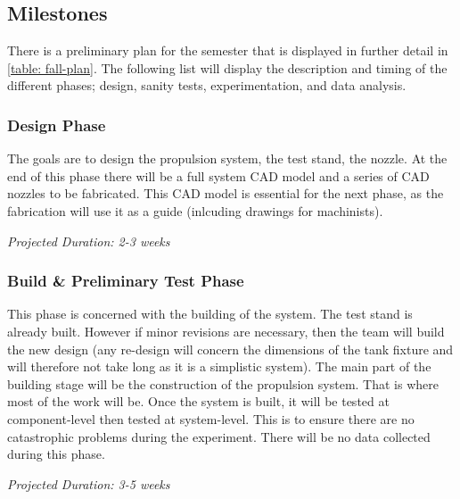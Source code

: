 \documentclass[conference]{IEEEtran} %
\begin{document}
\subsection{Milestones}
\label{subsec:milestones}

There is a preliminary plan for the semester that is displayed in further detail in \autoref{table: fall-plan}. The following list will display the description and timing
of the different phases; design, sanity tests, experimentation, and data analysis.

\subsubsection{Design Phase}
\label{subsubsec: design phase}
    The goals are to design the propulsion system, the test stand, the nozzle. At the end of this phase
    there will be a full system CAD model and a series of CAD nozzles to be fabricated. This CAD model is essential for the next phase, as the fabrication
    will use it as a guide (inlcuding drawings for machinists).

    \textit{Projected Duration: 2-3 weeks}

\subsubsection{Build \& Preliminary Test Phase}
\label{subsubsec: sanity test phase}
    This phase is concerned with the building of the system. The test stand is already built. However if minor revisions are necessary, then the team will
    build the new design (any re-design will concern the dimensions of the tank fixture and will therefore not take long as it is a simplistic system).
    The main part of the building stage will be the construction of the propulsion system. That is where most of the work will be. Once the system is built,
    it will be tested at component-level then tested at system-level. This is to ensure there are no catastrophic problems during the experiment.
    There will be no data collected during this phase.

    \textit{Projected Duration: 3-5 weeks}
\end{document}
